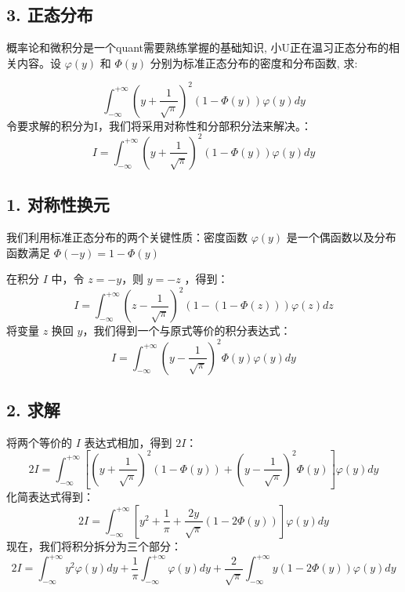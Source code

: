 \documentclass[UTF8]{ctexart}
\begin{document}
\subsection*{3. 正态分布}
概率论和微积分是一个quant需要熟练掌握的基础知识, 小U正在温习正态分布的相关内容。设 $\varphi(y)$ 和 $\Phi(y)$ 分别为标准正态分布的密度和分布函数, 求:

$$\int_{-\infty}^{+\infty}{\left(y+\frac{1}{\sqrt{\pi}}\right)^{2}(1-\Phi(y))\varphi
  (y)dy}$$
令要求解的积分为I，我们将采用对称性和分部积分法来解决。：
$$ I = \int_{-\infty}^{+\infty}{\left(y+\frac{1}{\sqrt{\pi}}\right)^{2}(1-\Phi(y))\varphi(y)dy} $$

\subsection*{1. 对称性换元}
我们利用标准正态分布的两个关键性质：密度函数 $\varphi(y)$ 是一个偶函数以及分布函数满足 $\Phi(-y) = 1 - \Phi(y)$

在积分 $I$ 中，令 $z = -y$，则 $y = -z$ ，得到：
$$ I = \int_{-\infty}^{+\infty}{\left(z-\frac{1}{\sqrt{\pi}}\right)^{2}(1-(1-\Phi(z)))\varphi(z)dz} $$
将变量 $z$ 换回 $y$，我们得到一个与原式等价的积分表达式：
$$ I = \int_{-\infty}^{+\infty}{\left(y-\frac{1}{\sqrt{\pi}}\right)^{2}\Phi(y)\varphi(y)dy} $$

\subsection*{2. 求解}
将两个等价的 $I$ 表达式相加，得到 $2I$：
$$ 2I = \int_{-\infty}^{+\infty} \left[ \left(y+\frac{1}{\sqrt{\pi}}\right)^{2}(1-\Phi(y)) + \left(y-\frac{1}{\sqrt{\pi}}\right)^{2}\Phi(y) \right] \varphi(y)dy $$
化简表达式得到：
$$ 2I = \int_{-\infty}^{+\infty} \left[ y^2 + \frac{1}{\pi} + \frac{2y}{\sqrt{\pi}}(1-2\Phi(y)) \right] \varphi(y)dy $$
现在，我们将积分拆分为三个部分：
$$ 2I = \int_{-\infty}^{+\infty} y^2 \varphi(y)dy + \frac{1}{\pi}\int_{-\infty}^{+\infty}\varphi(y)dy + \frac{2}{\sqrt{\pi}}\int_{-\infty}^{+\infty} y(1-2\Phi(y))\varphi(y)dy $$
\end{document}
